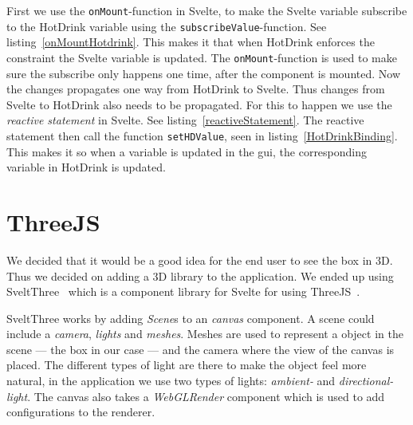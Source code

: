 First we use the 
\texttt{onMount}-function in Svelte, to make the Svelte variable subscribe to the HotDrink 
variable using the \texttt{subscribeValue}-function. See listing~\ref{onMountHotdrink}. 
This makes it that when HotDrink enforces the constraint the Svelte variable is updated. 
The \texttt{onMount}-function is used to make sure the subscribe only happens one time, 
after the component is mounted. Now the changes propagates one way from HotDrink to Svelte. 
Thus changes from Svelte to HotDrink also needs to be propagated. For this to happen we 
use the \textit{reactive statement} in Svelte. See listing~\ref{reactiveStatement}. The 
reactive statement then call the function \texttt{setHDValue}, seen in 
listing~\ref{HotDrinkBinding}. This makes it so when a variable is updated in the \gls{gui}, 
the corresponding variable in HotDrink is updated.

\section{ThreeJS}
We decided that it would be a good idea for the end user to see the box in 3D. Thus we 
decided on adding a 3D library to the application. We ended up using 
SveltThree~\cite{sveltthree} which is a component library for Svelte for using 
ThreeJS~\cite{threejs}. 

SveltThree works by adding \textit{Scene}s to an \textit{canvas} component. A scene 
could include a \textit{camera}, \textit{lights} and \textit{meshes}. Meshes are 
used to represent a object in the scene --- the box in our case --- and the camera 
where the view of the canvas is placed. The different types of light are there to 
make the object feel more natural, in the application we use two types of lights: 
\textit{ambient-} and \textit{directional-light}. The canvas also takes a 
\textit{WebGLRender} component which is used to add configurations to the renderer. 


